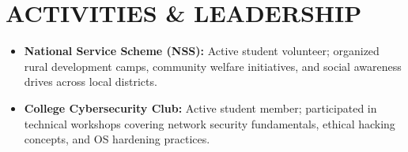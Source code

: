 \documentclass[10pt,letterpaper]{article}
\begin{document}
\section*{ACTIVITIES \& LEADERSHIP}
{\small
\begin{itemize}[leftmargin=1.0em, itemsep=2pt, parsep=0pt, topsep=2pt]
    \item \textbf{National Service Scheme (NSS):} Active student volunteer; organized rural development camps, community welfare initiatives, and social awareness drives across local districts.
    \item \textbf{College Cybersecurity Club:} Active student member; participated in technical workshops covering network security fundamentals, ethical hacking concepts, and OS hardening practices.
\end{itemize}
}
\end{document}
